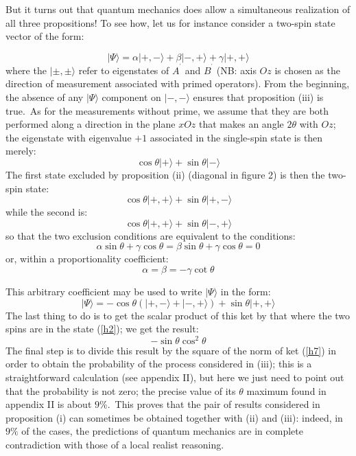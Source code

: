 \documentclass[12pt,onecolumn]{article}%
\begin{document}
But it turns out that quantum mechanics does allow a simultaneous realization
of all three propositions! To see how, let us for instance consider a two-spin
state vector of the form:%

\begin{equation}
|\Psi\rangle =\alpha|+,-\rangle +\beta|-,+\rangle +\gamma|+,+\rangle  \label{h1}%
\end{equation}
where the $|\pm,\pm\rangle$ refer to eigenstates of $A^{^{\prime}}$ and
$B^{^{\prime}}$ (NB: axis $Oz$ is chosen as the direction of measurement
associated with primed operators). From the beginning, the absence of any
$|\Psi\rangle $ component on $|-,-\rangle $ ensures that proposition (iii) is
true.\ As for the measurements without prime, we assume that they are both
performed along a direction in the plane $xOz$ that makes an angle $2\theta$
with $Oz$; the eigenstate with eigenvalue $+1$ associated in the single-spin
state is then merely:
\begin{equation}
\cos\theta|+\rangle +\sin\theta|-\rangle  \label{h2}%
\end{equation}
The first state excluded by proposition (ii) (diagonal in figure 2) is then
the two-spin state:
\begin{equation}
\cos\theta|+,+\rangle +\sin\theta|+,-\rangle  \label{h3}%
\end{equation}
while the second is:
\begin{equation}
\cos\theta|+,+\rangle +\sin\theta|-,+\rangle  \label{h4}%
\end{equation}
so that the two exclusion conditions are equivalent to the conditions:
\begin{equation}
\alpha\sin\theta+\gamma\cos\theta=\beta\sin\theta+\gamma\cos\theta=0
\label{h5}%
\end{equation}
or, within a proportionality coefficient:
\begin{equation}
\alpha=\beta=-\gamma\cot\theta\label{h6}%
\end{equation}


This arbitrary coefficient may be used to write $|\Psi\rangle $ in the form:
\begin{equation}
|\Psi\rangle =-\cos\theta\left(  |+,-\rangle +|-,+\rangle \right)  +\sin\theta|+,+\rangle 
\label{h7}%
\end{equation}
The last thing to do is to get the scalar product of this ket by that where
the two spins are in the state (\ref{h2}); we get the result:
\begin{equation}
-\sin\theta\cos^{2}\theta\label{h8}%
\end{equation}
The final step is to divide this result by the square of the norm of ket
(\ref{h7}) in order to obtain the probability of the process considered in
(iii); this is a straightforward calculation (see appendix II), but here we
just need to point out that the probability is not zero; the precise value of
its $\theta$ maximum found in appendix II is about $9\%$.\ This proves that
the pair of results considered in proposition (i) can sometimes be obtained
together with (ii) and (iii): indeed, in $9\%$ of the cases, the predictions
of quantum mechanics are in complete contradiction with those of a local
realist reasoning.
\end{document}
